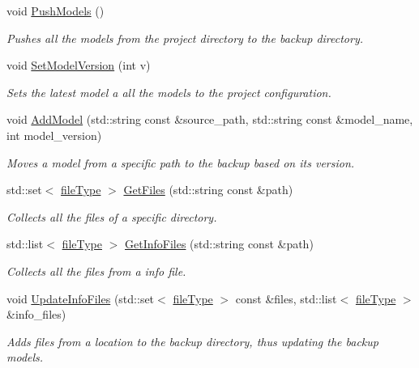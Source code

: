 \begin{DoxyCompactItemize}
\mbox{\label{namespacemlm_a25682986260a945e6d0693bcff5ae7fd}} 
void \mbox{\hyperlink{namespacemlm_a25682986260a945e6d0693bcff5ae7fd}{Push\+Models}} ()
\begin{DoxyCompactList}\small\item\em Pushes all the models from the project directory to the backup directory. \end{DoxyCompactList}\item 
void \mbox{\hyperlink{namespacemlm_afcb68a79f01929fd876415a6d501da7e}{Set\+Model\+Version}} (int v)
\begin{DoxyCompactList}\small\item\em Sets the latest model a all the models to the project configuration. \end{DoxyCompactList}\item 
void \mbox{\hyperlink{namespacemlm_a83ffb0aa3e0b11bc0bedf7213fd9d859}{Add\+Model}} (std\+::string const \&source\+\_\+path, std\+::string const \&model\+\_\+name, int model\+\_\+version)
\begin{DoxyCompactList}\small\item\em Moves a model from a specific path to the backup based on its version. \end{DoxyCompactList}\item 
std\+::set$<$ \mbox{\hyperlink{structmlm_1_1fileType}{file\+Type}} $>$ \mbox{\hyperlink{namespacemlm_a642c9c6f568a7faf5b14558678a85662}{Get\+Files}} (std\+::string const \&path)
\begin{DoxyCompactList}\small\item\em Collects all the files of a specific directory. \end{DoxyCompactList}\item 
std\+::list$<$ \mbox{\hyperlink{structmlm_1_1fileType}{file\+Type}} $>$ \mbox{\hyperlink{namespacemlm_a2f0ff65f0ef9855ab83fc2866291e06e}{Get\+Info\+Files}} (std\+::string const \&path)
\begin{DoxyCompactList}\small\item\em Collects all the files from a info file. \end{DoxyCompactList}\item 
void \mbox{\hyperlink{namespacemlm_aea15e59ba4d173999e421ef27c97cff7}{Update\+Info\+Files}} (std\+::set$<$ \mbox{\hyperlink{structmlm_1_1fileType}{file\+Type}} $>$ const \&files, std\+::list$<$ \mbox{\hyperlink{structmlm_1_1fileType}{file\+Type}} $>$ \&info\+\_\+files)
\begin{DoxyCompactList}\small\item\em Adds files from a location to the backup directory, thus updating the backup models. \end{DoxyCompactList}\item 

\end{DoxyCompactItemize}
